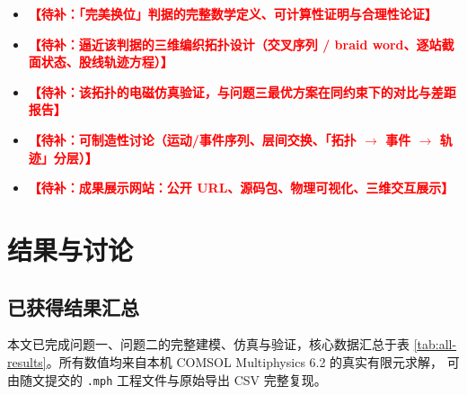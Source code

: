 \documentclass[12pt, a4paper]{ctexart}
\newcommand{\todo}[1]{\textcolor{red}{\textbf{【待补：#1】}}}
\begin{document}
\begin{itemize}[leftmargin=2em, itemsep=2pt]
\item \todo{「完美换位」判据的完整数学定义、可计算性证明与合理性论证}
\item \todo{逼近该判据的三维编织拓扑设计（交叉序列 / braid word、逐站截面状态、股线轨迹方程）}
\item \todo{该拓扑的电磁仿真验证，与问题三最优方案在同约束下的对比与差距报告}
\item \todo{可制造性讨论（运动/事件序列、层间交换、「拓扑 $\to$ 事件 $\to$ 轨迹」分层）}
\item \todo{成果展示网站：公开 URL、源码包、物理可视化、三维交互展示}
\end{itemize}

\section{结果与讨论}

\subsection{已获得结果汇总}

本文已完成问题一、问题二的完整建模、仿真与验证，核心数据汇总于表
\ref{tab:all-results}。所有数值均来自本机 COMSOL Multiphysics 6.2 的真实有限元求解，
可由随文提交的 \texttt{.mph} 工程文件与原始导出 CSV 完整复现。
\end{document}
